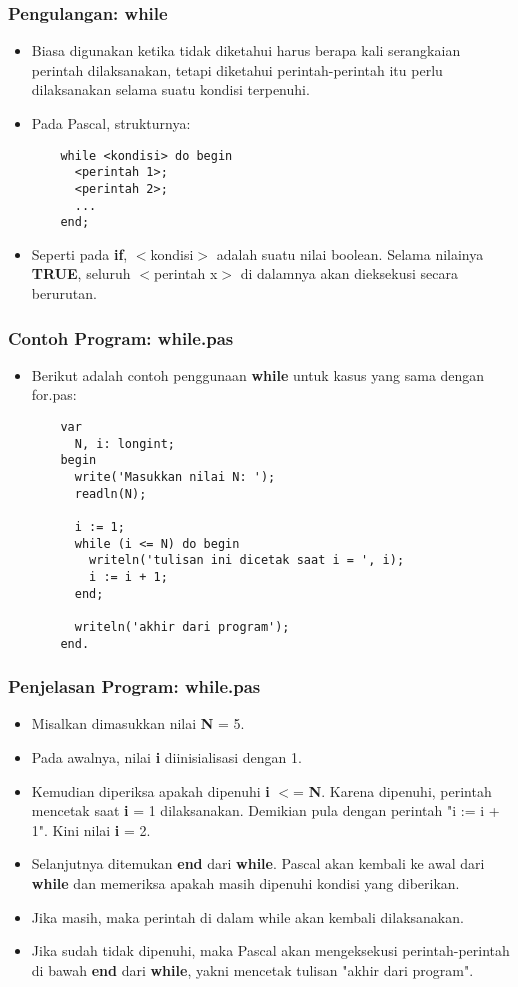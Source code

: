 \begin{frame}[fragile]
\frametitle{Pengulangan: while}
\begin{itemize}
  \item Biasa digunakan ketika tidak diketahui harus berapa kali serangkaian perintah dilaksanakan, tetapi diketahui perintah-perintah itu perlu dilaksanakan selama suatu kondisi terpenuhi.
  \item Pada Pascal, strukturnya:
  \begin{lstlisting}
    while <kondisi> do begin
      <perintah 1>;
      <perintah 2>;
      ...
    end;
  \end{lstlisting}
  \item Seperti pada \textbf{if}, $<$kondisi$>$ adalah suatu nilai boolean. Selama nilainya \textbf{TRUE}, seluruh $<$perintah x$>$ di dalamnya akan dieksekusi secara berurutan.
\end{itemize}
\end{frame}

\begin{frame}[fragile]
\frametitle{Contoh Program: while.pas}
\begin{itemize}
  \item Berikut adalah contoh penggunaan \textbf{while} untuk kasus yang sama dengan for.pas:
  \begin{lstlisting}
    var
      N, i: longint;
    begin
      write('Masukkan nilai N: ');
      readln(N);

      i := 1;
      while (i <= N) do begin
        writeln('tulisan ini dicetak saat i = ', i);
        i := i + 1;
      end;

      writeln('akhir dari program');
    end.
  \end{lstlisting}
\end{itemize}
\end{frame}

\begin{frame}
\frametitle{Penjelasan Program: while.pas}
\begin{itemize}
  \item Misalkan dimasukkan nilai \textbf{N} = 5.
  \item Pada awalnya, nilai \textbf{i} diinisialisasi dengan 1.
  \item Kemudian diperiksa apakah dipenuhi \textbf{i} $<$= \textbf{N}. Karena dipenuhi, perintah mencetak saat \textbf{i} = 1 dilaksanakan. Demikian pula dengan perintah "i := i + 1". Kini nilai \textbf{i} = 2.
  \item Selanjutnya ditemukan \textbf{end} dari \textbf{while}. Pascal akan kembali ke awal dari \textbf{while} dan memeriksa apakah masih dipenuhi kondisi yang diberikan.
  \item Jika masih, maka perintah di dalam while akan kembali dilaksanakan.
  \item Jika sudah tidak dipenuhi, maka Pascal akan mengeksekusi perintah-perintah di bawah \textbf{end} dari \textbf{while}, yakni mencetak tulisan "akhir dari program".
\end{itemize}
\end{frame}

